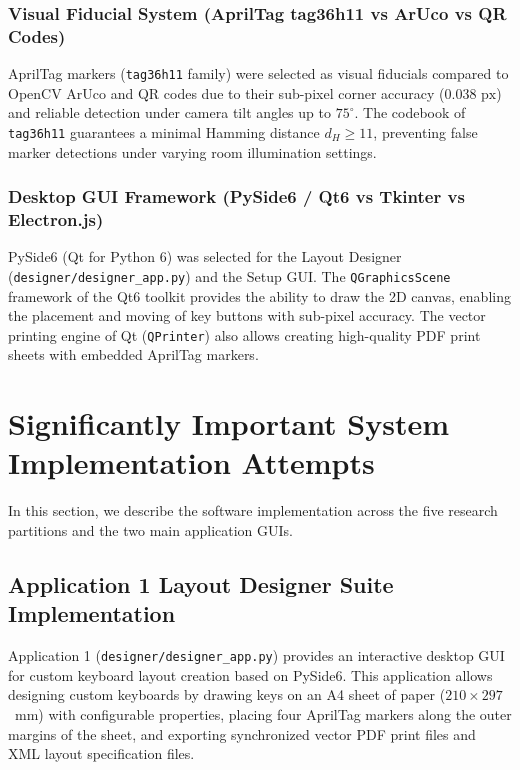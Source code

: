 \subsubsection{Visual Fiducial System (AprilTag tag36h11 vs ArUco vs QR Codes)}
AprilTag markers (\texttt{tag36h11} family) were selected as visual fiducials compared to OpenCV ArUco and QR codes due to their sub-pixel corner accuracy ($0.038\text{ px}$) and reliable detection under camera tilt angles up to $75^\circ$. The codebook of \texttt{tag36h11} guarantees a minimal Hamming distance $d_H \ge 11$, preventing false marker detections under varying room illumination settings.

\subsubsection{Desktop GUI Framework (PySide6 / Qt6 vs Tkinter vs Electron.js)}
PySide6 (Qt for Python 6) was selected for the Layout Designer (\texttt{designer/designer\_app.py}) and the Setup GUI. The \texttt{QGraphicsScene} framework of the Qt6 toolkit provides the ability to draw the 2D canvas, enabling the placement and moving of key buttons with sub-pixel accuracy. The vector printing engine of Qt (\texttt{QPrinter}) also allows creating high-quality PDF print sheets with embedded AprilTag markers.

\section{Significantly Important System Implementation Attempts}
\label{sec:imp_significant_attempts}
In this section, we describe the software implementation across the five research partitions and the two main application GUIs.

\subsection{Application 1 Layout Designer Suite Implementation}
Application 1 (\texttt{designer/designer\_app.py}) provides an interactive desktop GUI for custom keyboard layout creation based on PySide6. This application allows designing custom keyboards by drawing keys on an A4 sheet of paper ($210 \times 297$~mm) with configurable properties, placing four AprilTag markers along the outer margins of the sheet, and exporting synchronized vector PDF print files and XML layout specification files.

